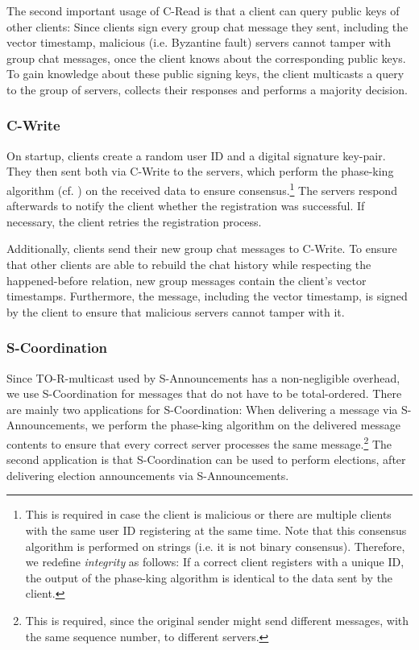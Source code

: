 \documentclass[runningheads]{llncs}
\begin{document}
The second important usage of \textsf{C-Read} is that a client can query public keys of other clients: Since clients sign every group chat message they sent, including the vector timestamp, malicious (i.e. Byzantine fault) servers cannot tamper with group chat messages, once the client knows about the corresponding public keys. To gain knowledge about these public signing keys, the client multicasts a query to the group of servers, collects their responses and performs a majority decision.

\subsubsection{C-Write}
On startup, clients create a random user ID and a digital signature key-pair. They then sent both via \textsf{C-Write} to the servers, which perform the phase-king algorithm (cf. ) on the received data to ensure consensus.\footnote{This is required in case the client is malicious or there are multiple clients with the same user ID registering at the same time. Note that this consensus algorithm is performed on strings (i.e. it is not binary consensus). Therefore, we redefine \textit{integrity} as follows: If a correct client registers with a unique ID, the output of the phase-king algorithm is identical to the data sent by the client.} The servers respond afterwards to notify the client whether the registration was successful. If necessary, the client retries the registration process.

Additionally, clients send their new group chat messages to \textsf{C-Write}. To ensure that other clients are able to rebuild the chat history while respecting the happened-before relation, new group messages contain the client's vector timestamps. Furthermore, the message, including the vector timestamp, is signed by the client to ensure that malicious servers cannot tamper with it.

\subsubsection{S-Coordination} 
Since TO-R-multicast used by \textsf{S-Announcements} has a non-negligible overhead, we use \textsf{S-Coordination} for messages that do not have to be total-ordered. There are mainly two applications for \textsf{S-Coordination}: When delivering a message via \textsf{S-Announcements}, we perform the phase-king algorithm on the delivered message contents to ensure that every correct server processes the same message.\footnote{This is required, since the original sender might send different messages, with the same sequence number, to different servers.} The second application is that \textsf{S-Coordination} can be used to perform elections, after delivering election announcements via \textsf{S-Announcements}. 
\end{document}
